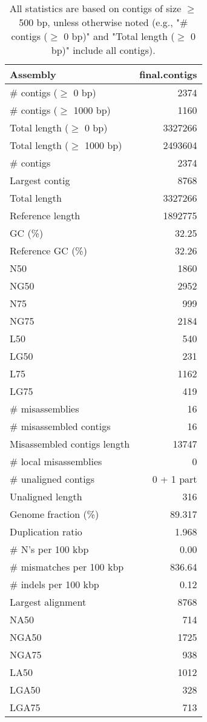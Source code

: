 \documentclass[12pt,a4paper]{article}
\begin{document}
\begin{table}[ht]
\begin{center}
\caption{All statistics are based on contigs of size $\geq$ 500 bp, unless otherwise noted (e.g., "\# contigs ($\geq$ 0 bp)" and "Total length ($\geq$ 0 bp)" include all contigs).}
\begin{tabular}{|l*{1}{|r}|}
\hline
Assembly & final.contigs \\ \hline
\# contigs ($\geq$ 0 bp) & 2374 \\ \hline
\# contigs ($\geq$ 1000 bp) & 1160 \\ \hline
Total length ($\geq$ 0 bp) & 3327266 \\ \hline
Total length ($\geq$ 1000 bp) & 2493604 \\ \hline
\# contigs & 2374 \\ \hline
Largest contig & 8768 \\ \hline
Total length & 3327266 \\ \hline
Reference length & 1892775 \\ \hline
GC (\%) & 32.25 \\ \hline
Reference GC (\%) & 32.26 \\ \hline
N50 & 1860 \\ \hline
NG50 & 2952 \\ \hline
N75 & 999 \\ \hline
NG75 & 2184 \\ \hline
L50 & 540 \\ \hline
LG50 & 231 \\ \hline
L75 & 1162 \\ \hline
LG75 & 419 \\ \hline
\# misassemblies & 16 \\ \hline
\# misassembled contigs & 16 \\ \hline
Misassembled contigs length & 13747 \\ \hline
\# local misassemblies & 0 \\ \hline
\# unaligned contigs & 0 + 1 part \\ \hline
Unaligned length & 316 \\ \hline
Genome fraction (\%) & 89.317 \\ \hline
Duplication ratio & 1.968 \\ \hline
\# N's per 100 kbp & 0.00 \\ \hline
\# mismatches per 100 kbp & 836.64 \\ \hline
\# indels per 100 kbp & 0.12 \\ \hline
Largest alignment & 8768 \\ \hline
NA50 & 714 \\ \hline
NGA50 & 1725 \\ \hline
NGA75 & 938 \\ \hline
LA50 & 1012 \\ \hline
LGA50 & 328 \\ \hline
LGA75 & 713 \\ \hline
\end{tabular}
\end{center}
\end{table}
\end{document}
